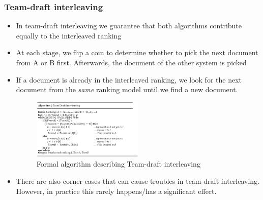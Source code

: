 \subsubsection{Team-draft interleaving}
\begin{itemize}
	\item In team-draft interleaving we guarantee that both algorithms contribute equally to the interleaved ranking
	\item At each stage, we flip a coin to determine whether to pick the next document from A or B first. Afterwards, the document of the other system is picked
	\item If a document is already in the interleaved ranking, we look for the next document from the \textit{same} ranking model until we find a new document.
	\begin{figure}[ht]
		\centering
		\includegraphics[width=0.5\textwidth]{figures/online_eval_team_draft_interleaving.png}
		\caption{Formal algorithm describing Team-draft interleaving}
		\label{img:online_eval_team_draft_interleaving}
	\end{figure}
	\item There are also corner cases that can cause troubles in team-draft interleaving. However, in practice this rarely happens/has a significant effect. 
\end{itemize}
